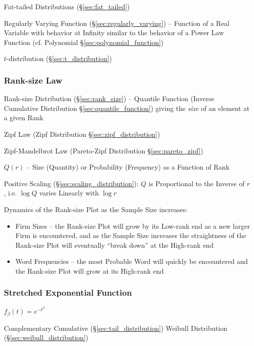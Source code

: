 \fist Fat-tailed Distributions (\S\ref{sec:fat_tailed})

\fist Regularly Varying Function (\S\ref{sec:regularly_varying}) -- Function of
a Real Variable with behavior at Infinity similar to the behavior of a Power Law
Function (cf. Polynomial \S\ref{sec:polynomial_function})

$t$-distribution (\S\ref{sec:t_distribution})



\subsubsection{Rank-size Law}\label{sec:ranksize_law}

Rank-size Distribution (\S\ref{sec:rank_size}) -- Quantile Function (Inverse
Cumulative Distribution \S\ref{sec:quantile_function}) giving the \emph{size} of
an element at a given Rank

Zipf Law (Zipf Distribution \S\ref{sec:zipf_distribution})

Zipf-Mandelbrot Law (Pareto-Zipf Distribution \S\ref{sec:pareto_zipf})

$Q(r)$ -- Size (Quantity) or Probability (Frequency) as a Function of Rank

Positive Scaling (\S\ref{sec:scaling_distribution}): $Q$ is Proportional to the
Inverse of $r$, i.e. $\log Q$ varies Linearly with $\log r$

Dynamics of the Rank-size Plot as the Sample Size increases:
\begin{itemize}
  \item Firm Sizes -- the Rank-size Plot will grow by its Low-rank end as a new
    larger Firm is encountered, and as the Sample Size increases the
    straightness of the Rank-size Plot will eventually ``break down'' at the
    High-rank end
  \item Word Frequencies -- the most Probable Word will quickly be encountered
    and the Rank-size Plot will grow at its High-rank end
\end{itemize}



\subsubsection{Stretched Exponential Function}\label{sec:stretched_exponential}

$f_\beta(t) = e^{-t^\beta}$

Complementary Cumulative (\S\ref{sec:tail_distribution}) Weibull
Distribution (\S\ref{sec:weibull_distribution})

